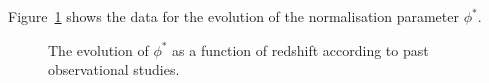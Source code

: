             Figure~\ref{fig:phi_evolution} shows the data for the evolution of the normalisation parameter $\phi^{*}$.
            \begin{figure}[ht]
                \begin{center}
                    \begingroup{}
                    \resizebox{0.7\textwidth}{!}{%
                        
                    }\endgroup
                    \caption{The evolution of $\phi^{*}$ as a function of redshift according to past observational studies.\label{fig:phi_evolution}}
                \end{center}
            \end{figure}
    
